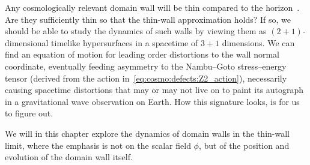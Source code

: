 



\newcommand*\hypsurf{\ALIAShypsurf}             %
\newcommand*\sppt{\ALIASsppt}                   %
\newcommand*\pert{\ALIASpert}                   %
\newcommand*\hypacc{\widehat}                   %
\newcommand*\Ft{\ALIASFt}                       %
\newcommand*\dummy{\ALIASdummy}                 %







Any cosmologically relevant domain wall will be thin compared to the horizon~\citep{pressDynamicalEvolutionDomain1989}. Are they sufficiently thin so that the thin-wall approximation holds? If so, we should be able to study the dynamics of such walls by viewing them as $(2+1)$-dimensional timelike hypersurfaces in a spacetime of $3+1$ dimensions. We can find an equation of motion for leading order distortions to the wall normal coordinate, eventually feeding asymmetry to the Nambu--Goto stress--energy tensor (derived from the action in~\cref{eq:cosmo:defects:Z2_action}), necessarily causing spacetime distortions that may or may not live on to paint its autograph in a gravitational wave observation on Earth. How this signature looks, is for us to figure out. 







We will in this chapter explore the dynamics of domain walls in the thin-wall limit, where the emphasis is not on the scalar field $\phi$, but of the position and evolution of the domain wall itself.


